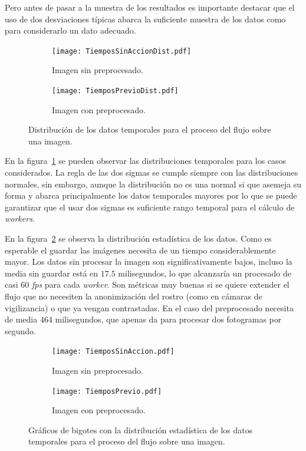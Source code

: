 Pero antes de pasar a la muestra de los resultados es importante destacar que el uso de dos desviaciones típicas abarca la suficiente muestra de los datos como para considerarlo un dato adecuado. 

\begin{figure}
	\begin{subfigure}[b]{\textwidth}
		\texttt{[image: TiemposSinAccionDist.pdf]}
		\caption{Imagen sin preprocesado.}
	\end{subfigure}
	\begin{subfigure}[b]{\textwidth}
		\texttt{[image: TiemposPrevioDist.pdf]}
		\caption{Imagen con preprocesado.}
	\end{subfigure}
	\caption{Distribución de los datos temporales para el proceso del flujo sobre una imagen.}
	\label{fig:dist1}
\end{figure}


En la figura~\ref{fig:dist1} se pueden observar las distribuciones temporales para los casos considerados. La regla de las dos sigmas se cumple siempre con las distribuciones normales, sin embargo, aunque la distribución no es una normal si que asemeja su forma y abarca principalmente los datos temporales mayores por lo que se puede garantizar que el usar dos sigmas es suficiente rango temporal para el cálculo de \textit{workers}.

En la figura~\ref{fig:dist2} se observa la distribución estadística de los datos. Como es esperable el guardar las imágenes necesita de un tiempo considerablemente mayor. Los datos sin procesar la imagen son significativamente bajos, incluso la media sin guardar está en $17.5$ milisegundos, lo que alcanzaría un procesado de casi $60$ \textit{fps} para cada \textit{worker}. Son métricas muy buenas si se quiere extender el flujo que no necesiten la anonimización del rostro (como en cámaras de vigilizancia) o que ya vengan contrastadas. En el caso del preprocesado necesita de media $464$ milisegundos, que apenas da para procesar dos fotogramas por segundo.

\begin{figure}[h]
	\begin{subfigure}[b]{\textwidth}
		\texttt{[image: TiemposSinAccion.pdf]}
		\caption{Imagen sin preprocesado.}
	\end{subfigure}
	\begin{subfigure}[b]{\textwidth}
		\texttt{[image: TiemposPrevio.pdf]}
		\caption{Imagen con preprocesado.}
	\end{subfigure}
	\caption{Gráficos de bigotes con la distribución estadística de los datos temporales para el proceso del flujo sobre una imagen.}
	\label{fig:dist2}
\end{figure}

